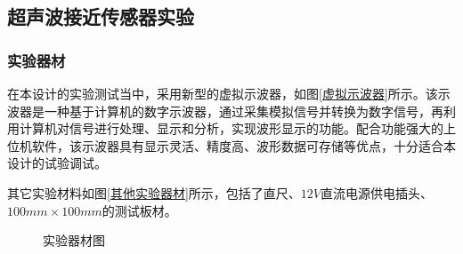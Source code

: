  

\subsection{超声波接近传感器实验}

\subsubsection{实验器材}
在本设计的实验测试当中，采用新型的虚拟示波器，如图\ref{虚拟示波器}所示。该示波器是一种基于计算机的数字示波器，通过采集模拟信号并转换为数字信号，再利用计算机对信号进行处理、显示和分析，实现波形显示的功能。配合功能强大的上位机软件，该示波器具有显示灵活、精度高、波形数据可存储等优点，十分适合本设计的试验调试。\par
其它实验材料如图\ref{其他实验器材}所示，包括了直尺、$12V$直流电源供电插头、$100mm\times100mm$的测试板材。

\begin{figure}[ht]
	\centering
	\caption{实验器材图}
	\label{实验器材图}
\end{figure}
